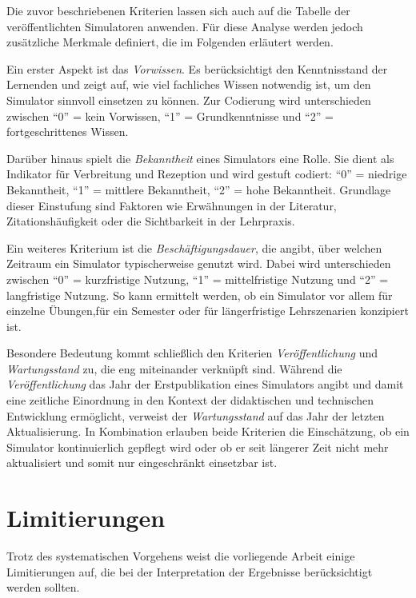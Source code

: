 Die zuvor beschriebenen Kriterien lassen sich auch auf die Tabelle der veröffentlichten Simulatoren anwenden. Für diese Analyse werden jedoch zusätzliche Merkmale definiert, die im Folgenden erläutert werden.

Ein erster Aspekt ist das \textit{Vorwissen}. Es berücksichtigt den Kenntnisstand der Lernenden und zeigt auf, wie viel fachliches Wissen notwendig ist, um den Simulator sinnvoll einsetzen zu können. Zur Codierung wird unterschieden zwischen \enquote{0} = kein Vorwissen, \enquote{1} = Grundkenntnisse und \enquote{2} = fortgeschrittenes Wissen.

Darüber hinaus spielt die \textit{Bekanntheit} eines Simulators eine Rolle. Sie dient als Indikator für Verbreitung und Rezeption und wird gestuft codiert: \enquote{0} = niedrige Bekanntheit, \enquote{1} = mittlere Bekanntheit, \enquote{2} = hohe Bekanntheit. Grundlage dieser Einstufung sind Faktoren wie Erwähnungen in der Literatur, Zitationshäufigkeit oder die Sichtbarkeit in der Lehrpraxis.

Ein weiteres Kriterium ist die \textit{Beschäftigungsdauer}, die angibt, über welchen Zeitraum ein Simulator typischerweise genutzt wird. Dabei wird unterschieden zwischen \enquote{0} = kurzfristige Nutzung, \enquote{1} = mittelfristige Nutzung und \enquote{2} = langfristige Nutzung. So kann ermittelt werden, ob ein Simulator vor allem für einzelne Übungen,für ein Semester oder für längerfristige Lehrszenarien konzipiert ist.

Besondere Bedeutung kommt schließlich den Kriterien \textit{Veröffentlichung} und \textit{Wartungsstand} zu, die eng miteinander verknüpft sind. Während die \textit{Veröffentlichung} das Jahr der Erstpublikation eines Simulators angibt und damit eine zeitliche Einordnung in den Kontext der didaktischen und technischen Entwicklung ermöglicht, verweist der \textit{Wartungsstand} auf das Jahr der letzten Aktualisierung. In Kombination erlauben beide Kriterien die Einschätzung, ob ein Simulator kontinuierlich gepflegt wird oder ob er seit längerer Zeit nicht mehr aktualisiert und somit nur eingeschränkt einsetzbar ist.

\section{Limitierungen}

Trotz des systematischen Vorgehens weist die vorliegende Arbeit einige Limitierungen auf, die bei der Interpretation der Ergebnisse berücksichtigt werden sollten.

